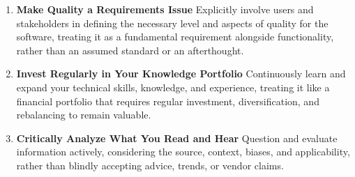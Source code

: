 \documentclass[11pt]{article}
\begin{document}
\begin{tcolorbox}[pragchapterbox={Chapter 1: A Pragmatic Philosophy}]
\begin{multicols}{2}
\begin{enumerate}[label=\arabic*., itemsep=1ex, topsep=0pt, partopsep=0pt, labelwidth=!, labelindent=0pt, leftmargin=*]
    \item \textbf{Make Quality a Requirements Issue}
    Explicitly involve users and stakeholders in defining the necessary level and aspects of quality for the software, treating it as a fundamental requirement alongside functionality, rather than an assumed standard or an afterthought.

    \item \textbf{Invest Regularly in Your Knowledge Portfolio}
    Continuously learn and expand your technical skills, knowledge, and experience, treating it like a financial portfolio that requires regular investment, diversification, and rebalancing to remain valuable.

    \item \textbf{Critically Analyze What You Read and Hear}
    Question and evaluate information actively, considering the source, context, biases, and applicability, rather than blindly accepting advice, trends, or vendor claims.
\end{enumerate}
\end{multicols} %
\end{tcolorbox}
\end{document}
